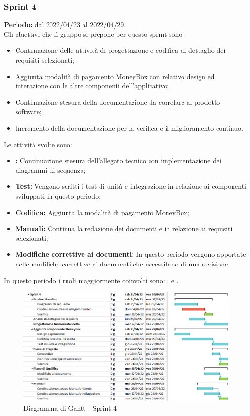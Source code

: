\subsubsection{Sprint 4} \label{subsubsection:sprint_4}
\textbf{Periodo:} dal 2022/04/23 al 2022/04/29.
\bigskip
\\Gli obiettivi che il gruppo si prepone per questo sprint\glo{} sono:
\begin{itemize}
  \item Continuazione delle attività di progettazione e codifica di dettaglio dei requisiti selezionati;
  \item Aggiunta modalità di pagamento MoneyBox\glo{} con relativo design ed interazione con le altre componenti dell'applicativo;
  \item Continuazione stesura della documentazione da correlare al prodotto software;
  \item Incremento della documentazione per la verifica e il miglioramento continuo.
\end{itemize}
Le attività svolte sono:
\begin{itemize}
  \item \textbf{\PB{}:} Continuazione stesura dell’allegato tecnico con implementazione dei diagrammi di sequenza;
  \item \textbf{Test:} Vengono scritti i test di unità e integrazione in relazione ai componenti sviluppati in questo periodo;
  \item \textbf{Codifica:} Aggiunta la modalità di pagamento MoneyBox\glo{};
  \item \textbf{Manuali:} Continua la redazione dei documenti \docNameVersionMU{} e \docNameVersionMS{} in relazione ai requisiti selezionati;
  \item \textbf{Modifiche correttive ai documenti:} In questo periodo vengono apportate delle modifiche correttive ai documenti che necessitano di una revisione.
\end{itemize}
In questo periodo i ruoli maggiormente coinvolti sono: \roleDesignerLow{}, \roleProgrammerLow{} e \roleVerifierLow{}.
\begin{figure}[H]
  \centering
  \includegraphics[scale=0.55]{immagini/4sprint.png}
  \caption{Diagramma di Gantt - Sprint 4}
\end{figure}

